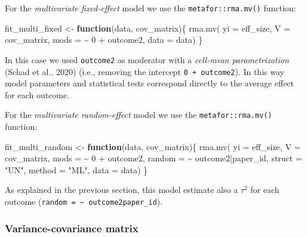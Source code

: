 \documentclass[
]{article}
\newenvironment{Shaded}{\begin{snugshade}}{\end{snugshade}}
\newcommand{\AttributeTok}[1]{\textcolor[rgb]{0.77,0.63,0.00}{#1}}
\newcommand{\ControlFlowTok}[1]{\textcolor[rgb]{0.13,0.29,0.53}{\textbf{#1}}}
\newcommand{\DecValTok}[1]{\textcolor[rgb]{0.00,0.00,0.81}{#1}}
\newcommand{\FunctionTok}[1]{\textcolor[rgb]{0.00,0.00,0.00}{#1}}
\newcommand{\NormalTok}[1]{#1}
\newcommand{\OtherTok}[1]{\textcolor[rgb]{0.56,0.35,0.01}{#1}}
\newcommand{\SpecialCharTok}[1]{\textcolor[rgb]{0.00,0.00,0.00}{#1}}
\newcommand{\StringTok}[1]{\textcolor[rgb]{0.31,0.60,0.02}{#1}}
\begin{document}
For the \emph{multivariate fixed-effect} model we use the \texttt{metafor::rma.mv()} function:

\begin{Shaded}
\begin{Highlighting}[]
\NormalTok{fit\_multi\_fixed }\OtherTok{\textless{}{-}} \ControlFlowTok{function}\NormalTok{(data, cov\_matrix)\{}
    \FunctionTok{rma.mv}\NormalTok{(}
        \AttributeTok{yi =}\NormalTok{ eff\_size,}
        \AttributeTok{V =}\NormalTok{ cov\_matrix,}
        \AttributeTok{mods =} \SpecialCharTok{\textasciitilde{}} \DecValTok{0} \SpecialCharTok{+}\NormalTok{ outcome2,}
        \AttributeTok{data =}\NormalTok{ data)}
\NormalTok{\}}
\end{Highlighting}
\end{Shaded}

In this case we used \texttt{outcome2} as moderator with a \emph{cell-mean parametrization} (Schad et al., 2020) (i.e., removing the intercept \texttt{0\ +\ outcome2}). In this way model parameters and statistical tests correspond directly to the average effect for each outcome.

For the \emph{multivariate random-effect} model we use the \texttt{metafor::rma.mv()} function:

\begin{Shaded}
\begin{Highlighting}[]
\NormalTok{fit\_multi\_random }\OtherTok{\textless{}{-}} \ControlFlowTok{function}\NormalTok{(data, cov\_matrix)\{}
    \FunctionTok{rma.mv}\NormalTok{(}
        \AttributeTok{yi =}\NormalTok{ eff\_size,}
        \AttributeTok{V =}\NormalTok{ cov\_matrix,}
        \AttributeTok{mods =} \SpecialCharTok{\textasciitilde{}} \DecValTok{0} \SpecialCharTok{+}\NormalTok{ outcome2,}
        \AttributeTok{random =} \SpecialCharTok{\textasciitilde{}}\NormalTok{ outcome2}\SpecialCharTok{|}\NormalTok{paper\_id,}
        \AttributeTok{struct =} \StringTok{"UN"}\NormalTok{,}
        \AttributeTok{method =} \StringTok{"ML"}\NormalTok{,}
        \AttributeTok{data =}\NormalTok{ data)}
\NormalTok{\}}
\end{Highlighting}
\end{Shaded}

As explained in the previous section, this model estimate also a \(\tau^2\) for each outcome (\texttt{random\ =\ \textasciitilde{}\ outcome2\textbar{}paper\_id}).

\hypertarget{variance-covariance-matrix}{%
\subsubsection{Variance-covariance matrix}\label{variance-covariance-matrix}}
\end{document}
